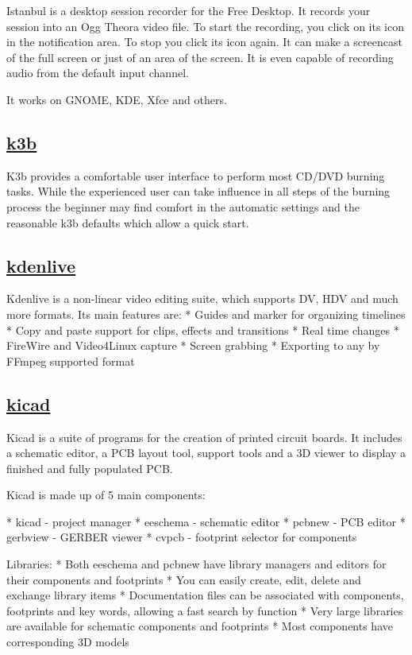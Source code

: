  Istanbul is a desktop session recorder for the Free Desktop.
 It records your session into an Ogg Theora video file.
 To start the recording, you click on its icon in the
 notification area. To stop you click its icon again.
 It can make a screencast of the full screen or just of an
 area of the screen. It is even capable of recording audio
 from the default input channel.
 
 It works on GNOME, KDE, Xfce and others.

\subsection{\href{http://www.k3b.org}{k3b}}

 K3b provides a comfortable user interface to perform most CD/DVD burning
 tasks. While the experienced user can take influence in all steps
 of the burning process the beginner may find comfort in the automatic settings
 and the reasonable k3b defaults which allow a quick start.

\subsection{\href{http://www.kdenlive.org/}{kdenlive}}

 Kdenlive is a non-linear video editing suite, which supports DV, HDV and
 much more formats.
 Its main features are:
  * Guides and marker for organizing timelines
  * Copy and paste support for clips, effects and transitions
  * Real time changes
  * FireWire and Video4Linux capture
  * Screen grabbing
  * Exporting to any by FFmpeg supported format

\subsection{\href{http://www.kicad-pcb.org}{kicad}}

 Kicad is a suite of programs for the creation of printed circuit boards.
 It includes a schematic editor, a PCB layout tool, support tools and a
 3D viewer to display a finished and fully populated PCB.
 
 Kicad is made up of 5 main components:
 
  * kicad - project manager
  * eeschema - schematic editor
  * pcbnew - PCB editor
  * gerbview - GERBER viewer
  * cvpcb - footprint selector for components
 
 Libraries:
  * Both eeschema and pcbnew have library managers and editors for their
    components and footprints
  * You can easily create, edit, delete and exchange library items
  * Documentation files can be associated with components, footprints and key
    words, allowing a fast search by function
  * Very large libraries are available for schematic components and footprints
  * Most components have corresponding 3D models

